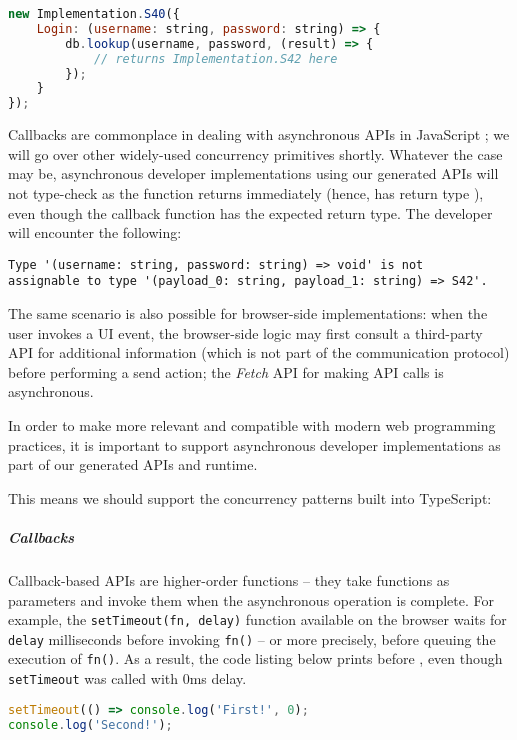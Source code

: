 \begin{lstlisting}[language=javascript]
new Implementation.S40({
	Login: (username: string, password: string) => {
		db.lookup(username, password, (result) => {
			// returns Implementation.S42 here
		});
	}
});
\end{lstlisting}

Callbacks are commonplace in dealing with 
asynchronous APIs in JavaScript
\cite{CallbackHell}; we will go over other widely-used
concurrency primitives shortly.
Whatever the case may be, asynchronous developer implementations
using our generated APIs will not type-check as the function
returns immediately (hence, has return type ),
even though the callback function has the expected return type.
The developer will encounter the following:

\begin{lstlisting}[tabsize=2,numbers=none]
Type '(username: string, password: string) => void' is not 
assignable to type '(payload_0: string, payload_1: string) => S42'.
\end{lstlisting}

The same scenario is also possible for browser-side implementations:
when the user invokes a UI event, the browser-side logic
may first consult a third-party API for additional information
(which is not part of the communication protocol)
before performing a send action; the \textit{Fetch} API \cite{Fetch}
for making API calls is asynchronous.

In order to make  more relevant and compatible
with modern web programming practices, it is important to
support asynchronous developer implementations as part of our
generated APIs and runtime. 

This means we should support
the concurrency patterns built into TypeScript:

\subparagraph{Callbacks}
Callback-based APIs are higher-order functions -- they take functions
as parameters and invoke them when the asynchronous operation is complete.
For example,
the \texttt{setTimeout(fn, delay)} function available on the browser
waits for \texttt{delay} milliseconds before invoking \texttt{fn()} --
or more precisely, before queuing the execution of \texttt{fn()}.
As a result, the code listing below prints 
before , even though \texttt{setTimeout}
was called with 0ms delay.

\begin{lstlisting}[language=javascript,numbers=none]
setTimeout(() => console.log('First!', 0);
console.log('Second!');
\end{lstlisting}

